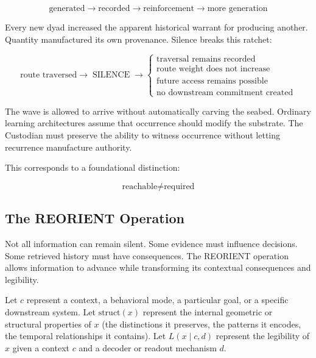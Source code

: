 \documentclass[12pt]{article}
\begin{document}
\begin{equation}
\text{generated} \rightarrow \text{recorded} \rightarrow \text{reinforcement} \rightarrow \text{more generation}
\end{equation}

Every new dyad increased the apparent historical warrant for producing another. Quantity manufactured its own provenance. Silence breaks this ratchet:

\begin{equation}
\text{route traversed} \rightarrow \operatorname{SILENCE} \rightarrow \begin{cases}
\text{traversal remains recorded}\\
\text{route weight does not increase}\\
\text{future access remains possible}\\
\text{no downstream commitment created}
\end{cases}
\end{equation}

The wave is allowed to arrive without automatically carving the seabed. Ordinary learning architectures assume that occurrence should modify the substrate. The Custodian must preserve the ability to witness occurrence without letting recurrence manufacture authority.

This corresponds to a foundational distinction:

\begin{equation}
\boxed{\text{reachable} \neq \text{required}}
\end{equation}

\subsection{The REORIENT Operation}

Not all information can remain silent. Some evidence must influence decisions. Some retrieved history must have consequences. The REORIENT operation allows information to advance while transforming its contextual consequences and legibility.

Let $c$ represent a context, a behavioral mode, a particular goal, or a specific downstream system. Let $\text{struct}(x)$ represent the internal geometric or structural properties of $x$ (the distinctions it preserves, the patterns it encodes, the temporal relationships it contains). Let $L(x \mid c, d)$ represent the legibility of $x$ given a context $c$ and a decoder or readout mechanism $d$.
\end{document}
